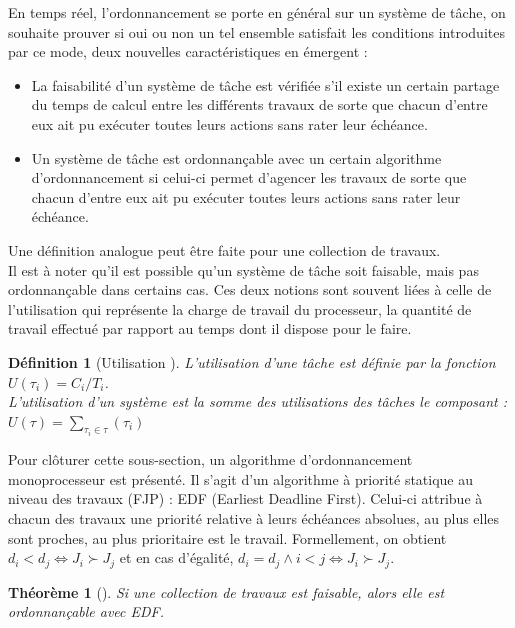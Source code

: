 \documentclass[a4paper]{report}
\theoremstyle{break}
\newtheorem{defin}{Définition}
\newtheorem{theo}{Théorème}
\begin{document}
En temps réel, l'ordonnancement se porte en général sur un système de tâche, on souhaite prouver si oui ou non un tel ensemble satisfait les conditions introduites par ce mode, deux nouvelles caractéristiques en émergent \cite{goossens2014os} :

\begin{itemize}
\item La faisabilité d'un système de tâche est vérifiée s'il existe un certain partage du temps de calcul entre les différents travaux de sorte que chacun d'entre eux ait pu exécuter toutes leurs actions sans rater leur échéance.
\item Un système de tâche est ordonnançable avec un certain algorithme d'ordonnancement si celui-ci permet d'agencer les travaux de sorte que chacun d'entre eux ait pu exécuter toutes leurs actions sans rater leur échéance.
\end{itemize}

Une définition analogue peut être faite pour une collection de travaux.\\
Il est à noter qu'il est possible qu'un système de tâche soit faisable, mais pas ordonnançable dans certains cas. Ces deux notions sont souvent liées à celle de l'utilisation qui représente la charge de travail du processeur, la quantité de travail effectué par rapport au temps dont il dispose pour le faire.

\begin{defin}[Utilisation \cite{goossens2014os}]
L'utilisation d'une tâche est définie par la fonction $U(\tau_i) = C_i/T_i$.\\
L'utilisation d'un système est la somme des utilisations des tâches le composant : $U(\tau) = \underset{\tau_i \in \tau}{\sum} (\tau_i)$
\end{defin}

Pour clôturer cette sous-section, un algorithme d'ordonnancement monoprocesseur est présenté. Il s'agit d'un algorithme à priorité statique au niveau des travaux (FJP) : EDF (Earliest Deadline First). Celui-ci attribue à chacun des travaux une priorité relative à leurs échéances absolues, au plus elles sont proches, au plus prioritaire est le travail. Formellement, on obtient $d_i < d_j \Leftrightarrow J_i \succ J_j$ et en cas d'égalité, $d_i = d_j \wedge i < j \Leftrightarrow J_i \succ J_j$.

\begin{theo}[\cite{goossens2014os}]
Si une collection de travaux est faisable, alors elle est ordonnançable avec EDF.
\end{theo}
\end{document}
